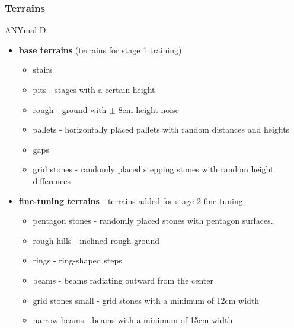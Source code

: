 \documentclass[9pt,twocolumn,twoside]{osajnl}
\begin{document}
\subsubsection*{Terrains}
ANYmal-D:
\begin{itemize}
    \item \textbf{base terrains} (terrains for stage 1 training)
    \begin{itemize}
        \item stairs
        \item pits - stages with a certain height
        \item rough - ground with $\pm$ 8cm height noise
        \item pallets - horizontally placed pallets with random distances and heights
        \item gaps
        \item grid stones - randomly placed stepping stones with random height differences
    \end{itemize}
    \item \textbf{fine-tuning terrains} - terrains added for stage 2 fine-tuning
    \begin{itemize}
        \item pentagon stones - randomly placed stones with pentagon surfaces.
        \item rough hills - inclined rough ground
        \item rings - ring-shaped steps
        \item beams - beams radiating outward from the center
        \item grid stones small - grid stones with a minimum of 12cm width
        \item narrow beams - beams with a minimum of 15cm width
    \end{itemize}
\end{itemize} 
\end{document}
